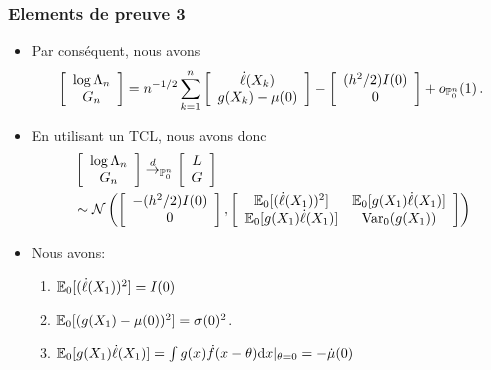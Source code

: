 \begin{frame}
\frametitle{Elements de preuve 3}
\begin{itemize}
\item Par conséquent, nous avons
\[
\left[\begin{array}{c}
  \log \Lambda_n \\
  G_n
\end{array}
\right]
=
n^{-1/2}  \sum_{k=1}^n \left[ \begin{array}{c} \dot \ell(X_k) \\ g(X_k) - \mu(0) \end{array} \right]
-
\left[
\begin{array}{c}
(h^2/2) I(0) \\
0
\end{array}
\right]
+
o_{\operatorname{{\mathbb P}}_{0}^n}(1) \,.
\]
\item En utilisant un TCL, nous avons donc
\begin{align*}
&\left[\begin{array}{c}
  \log \Lambda_n \\
  G_n
\end{array}
\right]
\stackrel{d}{\rightarrow}_{\operatorname{{\mathbb P}}_{0}^n}
\left[\begin{array}{c}
  L \\
  G
\end{array}
\right]
\\
&\sim
\mathcal{N}\left( \left[ \begin{array}{c} - (h^2/2) I(0) \\ 0 \end{array}\right], \left[
\begin{array}{cc}
\operatorname{{\mathbb E}}_0[ (\dot \ell(X_1))^2] & \operatorname{{\mathbb E}}_0[ g(X_1)  \dot \ell(X_1)] \\
\operatorname{{\mathbb E}}_0[ g(X_1)  \dot \ell(X_1)] & \operatorname{\mathrm{Var}}_0(g(X_1))
\end{array}
\right] \right)
\end{align*}
\item  Nous avons:
\begin{enumerate}
\item $\operatorname{{\mathbb E}}_0[ (\dot \ell(X_1))^2]= I(0)$
\item $\operatorname{{\mathbb E}}_0[ (g(X_1)- \mu(0))^2]= \sigma(0)^2$.
\item $\operatorname{{\mathbb E}}_0[ g(X_1) \dot\ell(X_1)]= \int g(x) \dot f(x-\theta) \mathrm{d} x \vert_{\theta=0}= -\dot\mu(0)$
\end{enumerate}
\end{itemize}
\end{frame}

